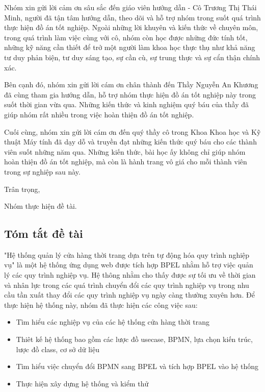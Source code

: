 \documentclass[a4paper, oneside, 12pt]{report}
\theoremstyle{definition}
\begin{document}
Nhóm xin gửi lời cảm ơn sâu sắc đến giáo viên hướng dẫn - Cô Trương Thị Thái Minh, người đã tận tâm hướng dẫn, theo dõi và hỗ trợ nhóm trong suốt quá trình thực hiện đồ án tốt nghiệp. Ngoài những lời khuyên và kiến thức về chuyên môn, trong quá trình làm việc cùng với cô, nhóm còn học được những đức tính tốt, những kỹ năng cần thiết để trở một người làm khoa học thực thụ như khả năng tư duy phản biện, tư duy sáng tạo, sự cần cù, sự trung thực và sự cẩn thận chính xác.

Bên cạnh đó, nhóm xin gửi lời cám ơn chân thành đến Thầy Nguyễn An Khương đã cùng tham gia hướng dẫn, hỗ trợ nhóm thực hiện đồ án tốt nghiệp này trong suốt thời gian vừa qua. Những kiến thức và kinh nghiệm quý báu của thầy đã giúp nhóm rất nhiều trong việc hoàn thiện đồ án tốt nghiệp.

Cuối cùng, nhóm xin gửi lời cám ơn đến quý thầy cô trong Khoa Khoa học và Kỹ thuật Máy tính đã dạy dỗ và truyền đạt những kiến thức quý báu cho các thành viên suốt những năm qua. Những kiến thức, bài học ấy không chỉ giúp nhóm hoàn thiện đồ án tốt nghiệp, mà còn là hành trang vô giá cho mỗi thành viên trong sự nghiệp sau này.

\hspace{10cm} Trân trọng,

\hspace{9cm} Nhóm thực hiện đề tài.

\newpage

\setlength{\parskip}{2.5mm}
\thispagestyle{plain}
\begin{center}
	\section*{Tóm tắt đề tài}
\end{center}

"Hệ thống quản lý cửa hàng thời trang dựa trên tự động hóa quy trình nghiệp vụ" là một hệ thống ứng dụng web được tích hợp BPEL nhằm hỗ trợ việc quản lý các quy trình nghiệp vụ. Hệ thông nhằm cho thấy được sự tối ưu về thời gian và nhân lực trong các quá trình chuyển đổi các quy trình nghiệp vụ trong nhu cầu tần xuất thay đổi các quy trình nghiệp vụ ngày càng thường xuyên hơn. Để thực hiện hệ thống này, nhóm đã thực hiện các công việc sau:
\begin{itemize}
	\item Tìm hiểu các nghiệp vụ của các hệ thống cửa hàng thời trang
	\item Thiêt kế hệ thống bao gồm các lược đồ usecase, BPMN, lựa chọn kiến trúc, lược đồ class, cơ sở dữ liệu
	\item Tìm hiểu việc chuyển đổi BPMN sang BPEL và tích hợp BPEL vào hệ thống
	\item Thực hiện xây dựng hệ thống và kiểm thử
\end{itemize}
\end{document}
